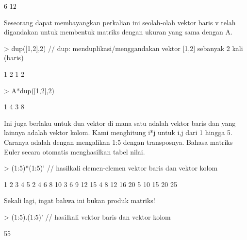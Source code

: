 \documentclass[a4paper,10pt]{article}
\begin{document}
\begin{eulernotebook}
\begin{eulercomment}
\begin{eulercomment}
\begin{eulercomment}
\begin{eulercomment}
\begin{eulercomment}
\begin{eulercomment}
\begin{euleroutput}
              6            12 
\end{euleroutput}
\begin{eulercomment}
Seseorang dapat membayangkan perkalian ini seolah-olah vektor baris v
telah digandakan untuk membentuk matriks dengan ukuran yang sama
dengan A.
\end{eulercomment}
\begin{eulerprompt}
> dup([1,2],2) // dup: menduplikasi/menggandakan vektor [1,2] sebanyak 2 kali (baris)
\end{eulerprompt}
\begin{euleroutput}
              1             2 
              1             2 
\end{euleroutput}
\begin{eulerprompt}
> A*dup([1,2],2)
\end{eulerprompt}
\begin{euleroutput}
              1             4 
              3             8 
\end{euleroutput}
\begin{eulercomment}
Ini juga berlaku untuk dua vektor di mana satu adalah vektor baris dan
yang lainnya adalah vektor kolom. Kami menghitung i*j untuk i,j dari 1
hingga 5. Caranya adalah dengan mengalikan 1:5 dengan transposnya.
Bahasa matriks Euler secara otomatis menghasilkan tabel nilai.
\end{eulercomment}
\begin{eulerprompt}
> (1:5)*(1:5)' // hasilkali elemen-elemen vektor baris dan vektor kolom
\end{eulerprompt}
\begin{euleroutput}
              1             2             3             4             5 
              2             4             6             8            10 
              3             6             9            12            15 
              4             8            12            16            20 
              5            10            15            20            25 
\end{euleroutput}
\begin{eulercomment}
Sekali lagi, ingat bahwa ini bukan produk matriks!
\end{eulercomment}
\begin{eulerprompt}
> (1:5).(1:5)' // hasilkali vektor baris dan vektor kolom
\end{eulerprompt}
\begin{euleroutput}
  55
\end{euleroutput}
\begin{eulerprompt}

\end{eulerprompt}
\end{eulercomment}
\end{eulercomment}
\end{eulercomment}
\end{eulercomment}
\end{eulercomment}
\end{eulercomment}
\end{eulernotebook}
\end{document}

